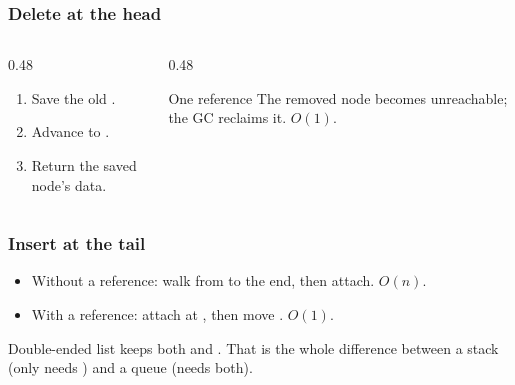 \documentclass[aspectratio=169,10pt,compress]{beamer}
\begin{document}
\begin{frame}[t,fragile]\frametitle{Delete at the head}
  \begin{columns}[T]
    \begin{column}{0.48\textwidth}
      \begin{enumerate}\small
        \item Save the old .
        \item Advance  to .
        \item Return the saved node's data.
      \end{enumerate}
    \end{column}
    \begin{column}{0.48\textwidth}
      \begin{block}{One reference}
        \small
        The removed node becomes unreachable; the GC reclaims it.
        $O(1)$.
      \end{block}
    \end{column}
  \end{columns}
\end{frame}

\begin{frame}[t,fragile]\frametitle{Insert at the tail}
  \begin{itemize}\small
    \item Without a  reference: walk from  to
          the end, then attach. $O(n)$.
    \item With a  reference: attach at ,
          then move . $O(1)$.
  \end{itemize}
  \vspace{0.4em}
  \begin{block}{Double-ended list}
    \small
     keeps both  and .
    That is the whole difference between a stack (only needs
    ) and a queue (needs both).
  \end{block}
\end{frame}

\end{document}
